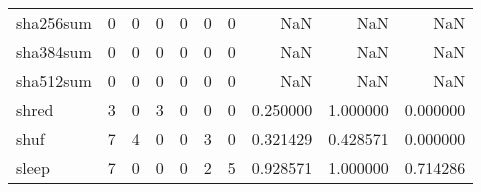 \begin{tabular}{lrrrrrrrrr}
sha256sum &                                                  0 &                                                  0 &                                                  0 &                                                  0 &                                                  0 &                                                  0 &                                                NaN &                                    NaN &                                  NaN \\
sha384sum &                                                  0 &                                                  0 &                                                  0 &                                                  0 &                                                  0 &                                                  0 &                                                NaN &                                    NaN &                                  NaN \\
sha512sum &                                                  0 &                                                  0 &                                                  0 &                                                  0 &                                                  0 &                                                  0 &                                                NaN &                                    NaN &                                  NaN \\
shred     &                                                  3 &                                                  0 &                                                  3 &                                                  0 &                                                  0 &                                                  0 &                                           0.250000 &                               1.000000 &                             0.000000 \\
shuf      &                                                  7 &                                                  4 &                                                  0 &                                                  0 &                                                  3 &                                                  0 &                                           0.321429 &                               0.428571 &                             0.000000 \\
sleep     &                                                  7 &                                                  0 &                                                  0 &                                                  0 &                                                  2 &                                                  5 &                                           0.928571 &                               1.000000 &                             0.714286 \\

\end{tabular}
